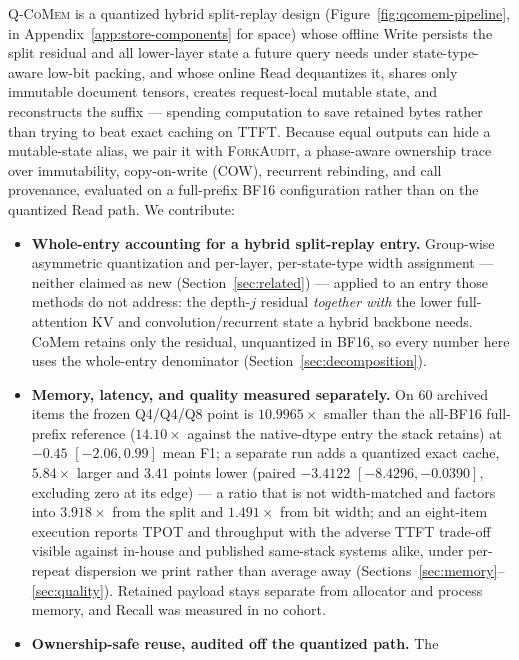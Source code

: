 \documentclass{article}
\newcommand{\qcomem}{\textsc{Q-CoMem}}
\newcommand{\method}{\textsc{ForkAudit}}
\begin{document}
\qcomem{} is a quantized hybrid split-replay design
(Figure~\ref{fig:qcomem-pipeline}, in Appendix~\ref{app:store-components} for
space) whose offline Write persists the split residual and all lower-layer state
a future query needs under state-type-aware low-bit packing, and whose online
Read dequantizes it, shares only immutable document tensors, creates
request-local mutable state, and reconstructs the suffix --- spending computation
to save retained bytes rather than trying to beat exact caching on TTFT.  Because
equal outputs can hide a mutable-state alias, we pair it with \method{}, a
phase-aware ownership trace over immutability, copy-on-write (COW), recurrent
rebinding, and call provenance, evaluated on a full-prefix BF16 configuration
rather than on the quantized Read path.  We contribute:
\begin{itemize}
  \setlength{\itemsep}{0pt}
  \setlength{\parskip}{0pt}
  \setlength{\topsep}{2pt}
  \setlength{\partopsep}{0pt}
  \item \textbf{Whole-entry accounting for a hybrid split-replay entry.}
Group-wise asymmetric quantization and per-layer, per-state-type width
assignment --- neither claimed as new (Section~\ref{sec:related}) --- applied to
an entry those methods do not address: the depth-$j$ residual \emph{together
with} the lower full-attention KV and convolution/recurrent state a hybrid
backbone needs.  CoMem retains only the residual, unquantized in BF16, so every
number here uses the whole-entry denominator
(Section~\ref{sec:decomposition}).
  \item \textbf{Memory, latency, and quality measured separately.} On 60
archived items the frozen Q4/Q4/Q8 point is $10.9965\times$ smaller than the
all-BF16 full-prefix reference ($14.10\times$ against the native-dtype entry the
stack retains) at $-0.45$ $[-2.06,0.99]$ mean F1; a separate run adds a
quantized exact cache, $5.84\times$ larger and $3.41$ points lower (paired
$-3.4122$ $[-8.4296,-0.0390]$, excluding zero at its edge) --- a ratio that is
not width-matched and factors into $3.918\times$ from the split and $1.491\times$
from bit width; and an eight-item execution reports TPOT and throughput with the
adverse TTFT trade-off visible against in-house and published same-stack systems
alike, under per-repeat dispersion we print rather than average away
(Sections~\ref{sec:memory}--\ref{sec:quality}).  Retained payload stays separate
from allocator and process memory, and Recall was measured in no cohort.
  \item \textbf{Ownership-safe reuse, audited off the quantized path.} The

\end{itemize}
\end{document}
